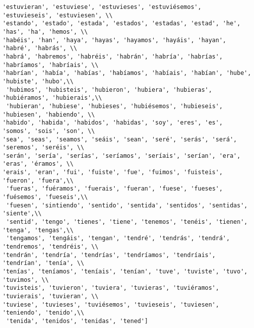 \documentclass[11pt]{article}
\begin{document}
\begin{Verbatim}[commandchars=\\\{\}]
'estuvieran', 'estuviese', 'estuvieses', 'estuviésemos', 'estuvieseis', 'estuviesen', \\
'estando', 'estado', 'estada', 'estados', 'estadas', 'estad', 'he', 'has', 'ha', 'hemos', \\
'habéis', 'han', 'haya', 'hayas', 'hayamos', 'hayáis', 'hayan', 'habré', 'habrás', \\
'habrá', 'habremos', 'habréis', 'habrán', 'habría', 'habrías', 'habríamos', 'habríais', \\
'habrían', 'había', 'habías', 'habíamos', 'habíais', 'habían', 'hube', 'hubiste', 'hubo',\\
 'hubimos', 'hubisteis', 'hubieron', 'hubiera', 'hubieras', 'hubiéramos', 'hubierais',\\
 'hubieran', 'hubiese', 'hubieses', 'hubiésemos', 'hubieseis', 'hubiesen', 'habiendo', \\
'habido', 'habida', 'habidos', 'habidas', 'soy', 'eres', 'es', 'somos', 'sois', 'son', \\
'sea', 'seas', 'seamos', 'seáis', 'sean', 'seré', 'serás', 'será', 'seremos', 'seréis', \\
'serán', 'sería', 'serías', 'seríamos', 'seríais', 'serían', 'era', 'eras', 'éramos', \\
'erais', 'eran', 'fui', 'fuiste', 'fue', 'fuimos', 'fuisteis', 'fueron', 'fuera',\\
 'fueras', 'fuéramos', 'fuerais', 'fueran', 'fuese', 'fueses', 'fuésemos', 'fueseis',\\
 'fuesen', 'sintiendo', 'sentido', 'sentida', 'sentidos', 'sentidas', 'siente',\\
 'sentid', 'tengo', 'tienes', 'tiene', 'tenemos', 'tenéis', 'tienen', 'tenga', 'tengas',\\
 'tengamos', 'tengáis', 'tengan', 'tendré', 'tendrás', 'tendrá', 'tendremos', 'tendréis', \\
'tendrán', 'tendría', 'tendrías', 'tendríamos', 'tendríais', 'tendrían', 'tenía', \\
'tenías', 'teníamos', 'teníais', 'tenían', 'tuve', 'tuviste', 'tuvo', 'tuvimos', \\
'tuvisteis', 'tuvieron', 'tuviera', 'tuvieras', 'tuviéramos', 'tuvierais', 'tuvieran', \\
'tuviese', 'tuvieses', 'tuviésemos', 'tuvieseis', 'tuviesen', 'teniendo', 'tenido',\\
 'tenida', 'tenidos', 'tenidas', 'tened']

    \end{Verbatim}
\end{document}
